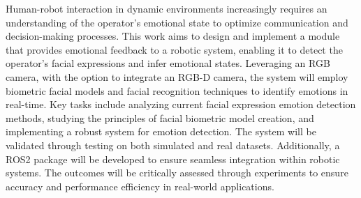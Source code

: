 Human-robot interaction in dynamic environments increasingly requires an understanding of the operator's emotional state to optimize communication and decision-making processes. This work aims to design and implement a module that provides emotional feedback to a robotic system, enabling it to detect the operator's facial expressions and infer emotional states. Leveraging an RGB camera, with the option to integrate an RGB-D camera, the system will employ biometric facial models and facial recognition techniques to identify emotions in real-time. Key tasks include analyzing current facial expression emotion detection methods, studying the principles of facial biometric model creation, and implementing a robust system for emotion detection. The system will be validated through testing on both simulated and real datasets. Additionally, a ROS2 package will be developed to ensure seamless integration within robotic systems. The outcomes will be critically assessed through experiments to ensure accuracy and performance efficiency in real-world applications.

